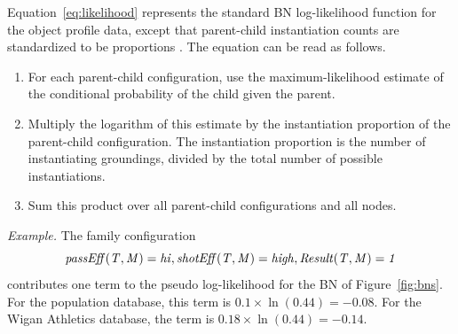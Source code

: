 \documentclass[conference]{IEEEtran}
\begin{document}
Equation~\ref{eq:likelihood} represents the standard BN log-likelihood function for the object profile data, except that parent-child instantiation counts are standardized to be proportions \cite{Schulte2012}. The equation can be read as follows.

\begin{enumerate}
\item For each parent-child configuration, 
use the maximum-likelihood estimate of the conditional probability of the child given the parent.
\item Multiply the logarithm of this estimate by the instantiation proportion of the parent-child configuration. The instantiation proportion is the number of instantiating groundings, divided by the total number of possible instantiations.
\item Sum this product over all parent-child configurations and all nodes. 
\end{enumerate}



{\em Example.} The family configuration \begin{displaymath} \it{passEff(T,M)=hi}, shotEff(T,M)=high, Result(T,M)=1\end{displaymath} contributes one term to the pseudo log-likelihood for the BN of Figure~\ref{fig:bns}. For the population database, this term is $0.1 \times \ln(0.44) =-0.08 $. For the  Wigan Athletics database, the term is $0.18 \times \ln(0.44) =-0.14 $. 

\end{document}
